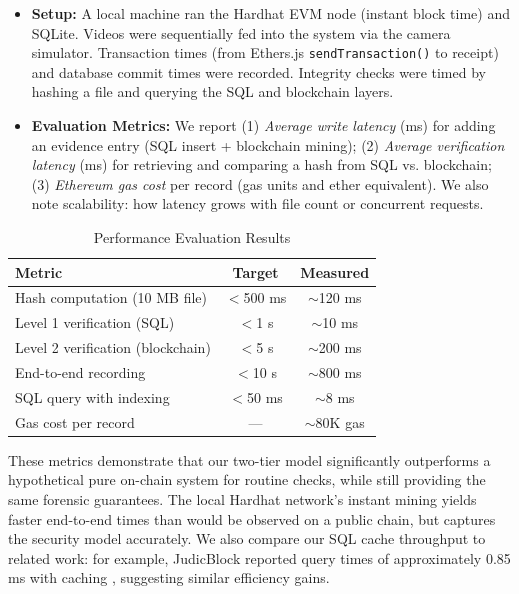 \documentclass[conference]{IEEEtran}
\begin{document}
\begin{itemize}
    \item \textbf{Setup:} A local machine ran the Hardhat EVM node (instant block time) and SQLite. Videos were sequentially fed into the system via the camera simulator. Transaction times (from Ethers.js \texttt{sendTransaction()} to receipt) and database commit times were recorded. Integrity checks were timed by hashing a file and querying the SQL and blockchain layers.

    \item \textbf{Evaluation Metrics:} We report (1) \textit{Average write latency} (ms) for adding an evidence entry (SQL insert + blockchain mining); (2) \textit{Average verification latency} (ms) for retrieving and comparing a hash from SQL vs. blockchain; (3) \textit{Ethereum gas cost} per record (gas units and ether equivalent). We also note scalability: how latency grows with file count or concurrent requests.
\end{itemize}

\begin{table}[htbp]
\caption{Performance Evaluation Results}
\begin{center}
\begin{tabular}{|l|c|c|}
\hline
\textbf{Metric} & \textbf{Target} & \textbf{Measured} \\
\hline
Hash computation (10 MB file) & $<$500 ms & $\sim$120 ms \\
\hline
Level 1 verification (SQL) & $<$1 s & $\sim$10 ms \\
\hline
Level 2 verification (blockchain) & $<$5 s & $\sim$200 ms \\
\hline
End-to-end recording & $<$10 s & $\sim$800 ms \\
\hline
SQL query with indexing & $<$50 ms & $\sim$8 ms \\
\hline
Gas cost per record & --- & $\sim$80K gas \\
\hline
\end{tabular}
\label{tab:perf}
\end{center}
\end{table}

These metrics demonstrate that our two-tier model significantly outperforms a hypothetical pure on-chain system for routine checks, while still providing the same forensic guarantees. The local Hardhat network's instant mining yields faster end-to-end times than would be observed on a public chain, but captures the security model accurately. We also compare our SQL cache throughput to related work: for example, JudicBlock reported query times of approximately 0.85 ms with caching \cite{b3}, suggesting similar efficiency gains.
\end{document}
